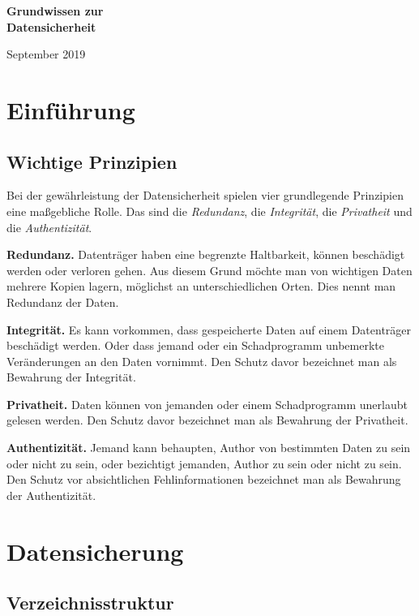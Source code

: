 \documentclass[a4paper,11pt,fleqn,twocolumn,twoside]{scrartcl}
\newcommand{\strong}[1]{\textsf{\textbf{#1}}}
\begin{document}
\thispagestyle{empty}

\noindent
{\LARGE\sffamily\bfseries
Grundwissen zur\\
Datensicherheit\par}

\vspace{1em}\noindent
September 2019

\tableofcontents

\section{Einführung}
\subsection{Wichtige Prinzipien}

Bei der gewährleistung der Datensicherheit spielen
vier grundlegende Prinzipien eine maßgebliche Rolle.
Das sind die \emph{Redundanz},
die \emph{Integrität}, die \emph{Privatheit} und die
\emph{Authentizität}.

\strong{Redundanz.}
Datenträger haben eine begrenzte Haltbarkeit, können beschädigt werden
oder verloren gehen. Aus diesem Grund möchte man von wichtigen Daten
mehrere Kopien lagern, möglichst an unterschiedlichen Orten.
Dies nennt man Redundanz der Daten.

\strong{Integrität.}
Es kann vorkommen, dass gespeicherte Daten auf einem Datenträger
beschädigt werden. Oder dass jemand oder ein Schadprogramm
unbemerkte Veränderungen an den Daten vornimmt. Den Schutz davor
bezeichnet man als Bewahrung der Integrität.

\strong{Privatheit.}
Daten können von jemanden oder einem Schadprogramm unerlaubt
gelesen werden. Den Schutz davor bezeichnet man als
Bewahrung der Privatheit.

\strong{Authentizität.}
Jemand kann behaupten, Author von bestimmten Daten zu sein
oder nicht zu sein, oder bezichtigt jemanden, Author zu sein
oder nicht zu sein. Den Schutz vor absichtlichen Fehlinformationen
bezeichnet man als Bewahrung der Authentizität.

\section{Datensicherung}
\subsection{Verzeichnisstruktur}
\end{document}
